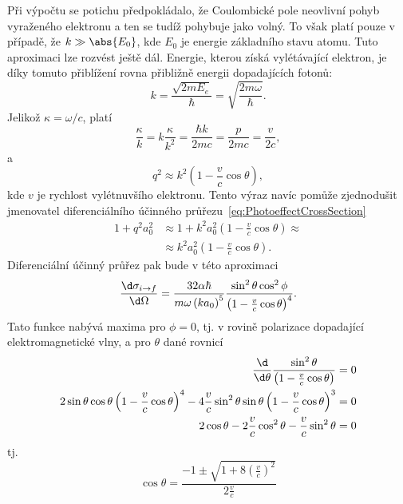 \begin{solution}
	Při výpočtu se potichu předpokládalo, že Coulombické pole neovlivní pohyb vyraženého elektronu a ten se tudíž pohybuje jako volný.
	To však platí pouze v případě, že $k\gg\abs{E_{0}}$, kde $E_{0}$ je energie základního stavu atomu.
	Tuto aproximaci lze rozvést ještě dál.
	Energie, kterou získá vylétávající elektron, je díky tomuto přiblížení rovna přibližně energii dopadajících fotonů:
	\begin{equation}
		k=\frac{\sqrt{2mE_{e}}}{\hbar}
		 =\sqrt{\frac{2m\omega}{\hbar}}.
	\end{equation}
	Jelikož $\kappa=\omega/c$, platí
	\begin{equation}
		\frac{\kappa}{k}
			=k\frac{\kappa}{k^{2}}
			=\frac{\hbar k}{2mc}
			=\frac{p}{2mc}
			=\frac{v}{2c},
	\end{equation}
	a
	\begin{equation}
		q^{2}\approx k^{2}\left(1-\frac{v}{c}\cos{\theta}\right),
	\end{equation}
	kde $v$ je rychlost vylétnuvšího elektronu.
	Tento výraz navíc pomůže zjednodušit jmenovatel diferenciálního účinného průřezu~\eqref{eq:PhotoeffectCrossSection}
	\begin{align}
		1+q^{2}a_{0}^{2}
			&\approx1+k^{2}a_{0}^{2}\left(1-\frac{v}{c}\cos{\theta}\right)\approx\nonumber\\
			&\approx k^{2}a_{0}^{2}\left(1-\frac{v}{c}\cos{\theta}\right).
	\end{align}
	Diferenciální účinný průřez pak bude v této aproximaci
	\begin{equation}
		\frac{\d\sigma_{i\rightarrow f}}{\d\Omega}
			=\frac{32\alpha\hbar}{m\omega\left(ka_{0}\right)^{5}}
				\frac{\sin^{2}\theta\cos^{2}\phi}{\left(1-\frac{v}{c}\cos{\theta}\right)^{4}}.
	\end{equation}
	Tato funkce nabývá maxima pro $\phi=0$, tj. v rovině polarizace dopadající elektromagnetické vlny, a pro $\theta$ dané rovnicí
	\begin{align}
		\frac{\d}{\d\theta}\frac{\sin^{2}\theta}{\left(1-\frac{v}{c}\cos{\theta}\right)}
			&=0\nonumber\\
		2\sin{\theta}\cos{\theta}\left(1-\frac{v}{c}\cos{\theta}\right)^{4}
			-4\frac{v}{c}\sin^{2}\theta\sin{\theta}\left(1-\frac{v}{c}\cos{\theta}\right)^{3}
			&=0\nonumber\\
		2\cos{\theta}-2\frac{v}{c}\cos^{2}\theta-\frac{v}{c}\sin^{2}\theta
			&=0
	\end{align}
	tj.
	\begin{equation}
		\cos{\theta}
			=\frac{-1\pm\sqrt{1+8\left(\frac{v}{c}\right)^{2}}}{2\frac{v}{c}}

\end{equation}
\end{solution}
